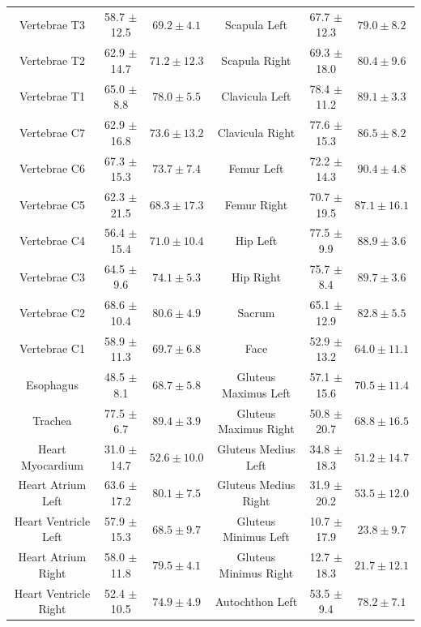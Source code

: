 \begin{table}[t!]
{{\begin{tabular}{cccccc}
Vertebrae T3 & 58.7 $\pm$ 12.5 & $\bm{69.2 \pm 4.1}$ & Scapula Left & 67.7 $\pm$ 12.3 & $\bm{79.0 \pm 8.2}$ \\
Vertebrae T2 & 62.9 $\pm$ 14.7 & $\bm{71.2 \pm 12.3}$ & Scapula Right & 69.3 $\pm$ 18.0 & $\bm{80.4 \pm 9.6}$ \\
Vertebrae T1 & 65.0 $\pm$ 8.8 & $\bm{78.0 \pm 5.5}$ & Clavicula Left & 78.4 $\pm$ 11.2 & $\bm{89.1 \pm 3.3}$ \\
Vertebrae C7 & 62.9 $\pm$ 16.8 & $\bm{73.6 \pm 13.2}$ & Clavicula Right & 77.6 $\pm$ 15.3 & $\bm{86.5 \pm 8.2}$ \\
Vertebrae C6 & 67.3 $\pm$ 15.3 & $\bm{73.7 \pm 7.4}$ & Femur Left & 72.2 $\pm$ 14.3 & $\bm{90.4 \pm 4.8}$ \\
Vertebrae C5 & 62.3 $\pm$ 21.5 & $\bm{68.3 \pm 17.3}$ & Femur Right & 70.7 $\pm$ 19.5 & $\bm{87.1 \pm 16.1}$ \\
Vertebrae C4 & 56.4 $\pm$ 15.4 & $\bm{71.0 \pm 10.4}$ & Hip Left & 77.5 $\pm$ 9.9 & $\bm{88.9 \pm 3.6}$ \\
Vertebrae C3 & 64.5 $\pm$ 9.6 & $\bm{74.1 \pm 5.3}$ & Hip Right & 75.7 $\pm$ 8.4 & $\bm{89.7 \pm 3.6}$ \\
Vertebrae C2 & 68.6 $\pm$ 10.4 & $\bm{80.6 \pm 4.9}$ & Sacrum & 65.1 $\pm$ 12.9 & $\bm{82.8 \pm 5.5}$ \\
Vertebrae C1 & 58.9 $\pm$ 11.3 & $\bm{69.7 \pm 6.8}$ & Face & 52.9 $\pm$ 13.2 & $\bm{64.0 \pm 11.1}$ \\
Esophagus & 48.5 $\pm$ 8.1 & $\bm{68.7 \pm 5.8}$ & Gluteus Maximus Left & 57.1 $\pm$ 15.6 & $\bm{70.5 \pm 11.4}$ \\
Trachea & 77.5 $\pm$ 6.7 & $\bm{89.4 \pm 3.9}$ & Gluteus Maximus Right & 50.8 $\pm$ 20.7 & $\bm{68.8 \pm 16.5}$ \\
Heart Myocardium & 31.0 $\pm$ 14.7 & $\bm{52.6 \pm 10.0}$ & Gluteus Medius Left & 34.8 $\pm$ 18.3 & $\bm{51.2 \pm 14.7}$ \\
Heart Atrium Left & 63.6 $\pm$ 17.2 & $\bm{80.1 \pm 7.5}$ & Gluteus Medius Right & 31.9 $\pm$ 20.2 & $\bm{53.5 \pm 12.0}$ \\
Heart Ventricle Left & 57.9 $\pm$ 15.3 & $\bm{68.5 \pm 9.7}$ & Gluteus Minimus Left & 10.7 $\pm$ 17.9 & $\bm{23.8 \pm 9.7}$ \\
Heart Atrium Right & 58.0 $\pm$ 11.8 & $\bm{79.5 \pm 4.1}$ & Gluteus Minimus Right & 12.7 $\pm$ 18.3 & $\bm{21.7 \pm 12.1}$ \\
Heart Ventricle Right & 52.4 $\pm$ 10.5 & $\bm{74.9 \pm 4.9}$ & Autochthon Left & 53.5 $\pm$ 9.4 & $\bm{78.2 \pm 7.1}$ \\

\end{tabular}}}
\end{table}
